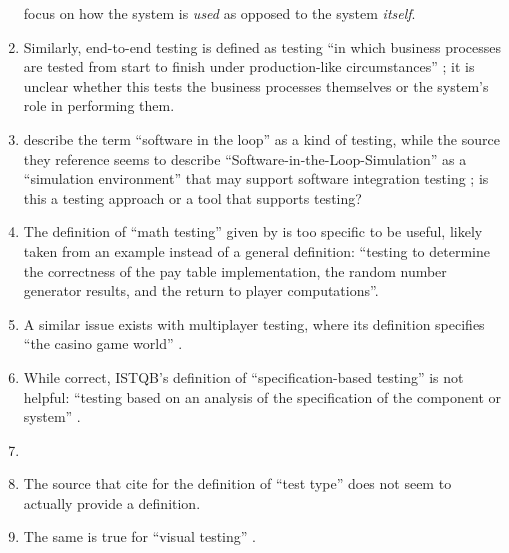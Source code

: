 \begin{enumerate}
          focus on how the system is \emph{used} as opposed to the system
          \emph{itself}.
    \item %
          Similarly, end-to-end testing is defined as testing ``in which
          business processes are tested from start to finish under
          production-like circumstances'' \citepISTQB{}; it is unclear
          whether this tests the business processes themselves or the system's
          role in performing them.
    \item %
          \citetISTQB{} describe the term ``software in the loop'' as a kind of
          testing, while the source they reference seems to
          describe ``Software-in-the-Loop-Simulation'' as a ``simulation
          environment'' that may support software integration testing
          \citep[p.~153]{SPICE2022}; is this a testing approach or a tool
          that supports testing?
    \item %
          The definition of ``math testing'' given by \citetISTQB{} is
          too specific to be useful, likely taken from an example instead of
          a general definition: ``testing to determine the correctness of the
          pay table implementation, the random number generator results, and
          the return to player computations''.
    \item %
          A similar issue exists with multiplayer testing, where its
          definition specifies ``the casino game world'' \citepISTQB{}.
    \item %
          While correct, ISTQB's definition of ``specification-based testing''
          is not helpful: ``testing based on an analysis of the specification
          of the component or system'' \citepISTQB{}.
    \item %
          \parSheetTestFlaw{}
    \item %
          The source that \citetISTQB{} cite for the definition of ``test
          type'' does not seem to actually provide a definition.
    \item %
          The same is true for ``visual testing'' \citepISTQB{}.

\end{enumerate}
